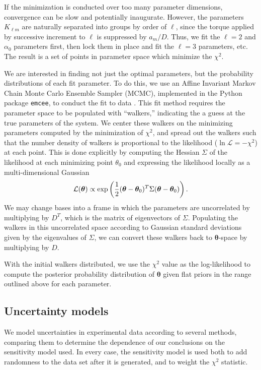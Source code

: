 \documentclass[11pt]{article}
\begin{document}
If the minimization is conducted over too many parameter dimensions, convergence can be slow and potentially inaugurate. However, the parameters $K_{\ell m}$ are naturally separated into groups by order of $\ell$, since the torque applied by successive increment to $\ell$ is suppressed by $a_m/D$. Thus, we fit the $\ell=2$ and $\alpha_0$ parameters first, then lock them in place and fit the $\ell=3$ parameters, etc. The result is a set of points in parameter space which minimize the $\chi^2$.

We are interested in finding not just the optimal parameters, but the probability distributions of each fit parameter. To do this, we use an Affine Invariant Markov Chain Monte Carlo Ensemble Sampler (MCMC), implemented in the Python package \texttt{emcee}, to conduct the fit to data \cite{ForemanMackey2013emceeTM}. This fit method requires the parameter space to be populated with ``walkers,'' indicating the a guess at the true parameters of the system. We center these walkers on the minimizing parameters computed by the minimization of $\chi^2$, and spread out the walkers such that the number density of walkers is proportional to the likelihood ($\ln \mathcal{L} = -\chi^2$) at each point. This is done explicitly by computing the Hessian $\Sigma$ of the likelihood at each minimizing point $\theta_0$ and expressing the likelihood locally as a multi-dimensional Gaussian
\begin{equation}
\mathcal{L}(\bm \theta) \propto \text{exp}\left( \frac{1}{2}(\bm \theta-\bm \theta_0)^T \Sigma (\bm \theta-\bm \theta_0) \right).
\end{equation}
We may change bases into a frame in which the parameters are uncorrelated by multiplying by $D^T$, which is the matrix of eigenvectors of $\Sigma$. Populating the walkers in this uncorrelated space according to Gaussian standard deviations given by the eigenvalues of $\Sigma$, we can convert these walkers back to $\bm \theta$-space by multiplying by $D$.

With the initial walkers distributed, we use the $\chi^2$ value as the log-likelihood to compute the posterior probability distribution of $\bm \theta$ given flat priors in the range outlined above for each parameter.


\subsection{Uncertainty models}
\label{sec:uncertainty-models}
We model uncertainties in experimental data according to several methods, comparing them to determine the dependence of our conclusions on the sensitivity model used. In every case, the sensitivity model is used both to add randomness to the data set after it is generated, and to weight the $\chi^2$ statistic.
\end{document}
